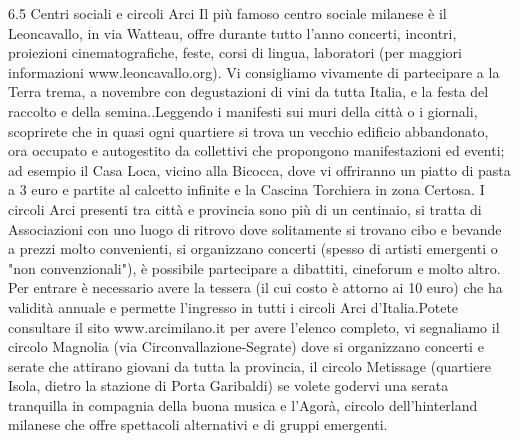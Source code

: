 6.5 Centri sociali e circoli Arci
Il più famoso centro sociale milanese è il Leoncavallo, in via Watteau, offre durante tutto l'anno concerti, incontri, proiezioni cinematografiche, feste, corsi di lingua, laboratori (per maggiori informazioni www.leoncavallo.org). Vi consigliamo vivamente di partecipare a la Terra trema, a novembre con degustazioni di vini da tutta Italia, e la festa del raccolto e della semina..Leggendo i manifesti sui muri della città o i giornali, scoprirete che in quasi ogni quartiere si trova un vecchio edificio abbandonato, ora occupato e autogestito da collettivi che propongono manifestazioni ed eventi; ad esempio il Casa Loca, vicino alla Bicocca, dove vi offriranno un piatto di pasta a 3 euro e partite al calcetto infinite e la Cascina Torchiera in zona Certosa.
I circoli Arci presenti tra città e provincia sono più di un centinaio, si tratta di Associazioni con uno luogo di ritrovo dove solitamente si trovano cibo e bevande a prezzi molto convenienti, si organizzano concerti (spesso di artisti emergenti o "non convenzionali"), è possibile partecipare a dibattiti, cineforum e molto altro. 
Per entrare è necessario avere la tessera (il cui costo è attorno ai 10 euro) che ha validità annuale e permette l'ingresso in tutti i circoli Arci d'Italia.Potete consultare il sito www.arcimilano.it per avere l'elenco completo, vi segnaliamo il circolo Magnolia (via Circonvallazione-Segrate) dove si organizzano concerti e serate che attirano giovani da tutta la provincia, il circolo Metissage (quartiere Isola, dietro la stazione di Porta Garibaldi) se volete godervi una serata tranquilla in compagnia della buona musica e l'Agorà, circolo dell'hinterland milanese che offre spettacoli alternativi e di gruppi emergenti.  

